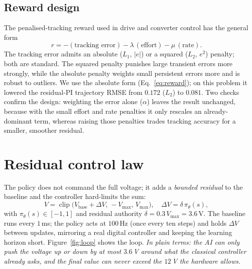 \documentclass[10pt,twocolumn]{article}
\newcommand{\eli}[1]{\textit{In plain terms: #1}}
\begin{document}
\subsection{Reward design}
The penalised-tracking reward used in drive and converter control has the
general form
\[
  r = -(\text{tracking error})-\lambda\,(\text{effort})-\mu\,(\text{rate}).
\]
The tracking error admits an absolute ($L_1$, $|e|$) or a squared ($L_2$,
$e^2$) penalty; both are standard. The squared penalty punishes large
transient errors more strongly, while the absolute penalty weights small
persistent errors more and is robust to outliers. We use the absolute
form (Eq.~\eqref{eq:reward}); on this problem it lowered the residual-PI
trajectory RMSE from $0.172$ ($L_2$) to $0.081$. Two checks confirm the
design: weighting the error alone ($\alpha$) leaves the result unchanged,
because with the small effort and rate penalties it only rescales an
already-dominant term, whereas raising those penalties trades tracking
accuracy for a smaller, smoother residual.

\section{Residual control law}
The policy does not command the full voltage; it adds a \emph{bounded
residual} to the baseline and the controller hard-limits the sum:
\begin{equation}
  V = \operatorname{clip}\!\big(V_{\mathrm{base}}+\Delta V,\,
      -V_{\max},\,V_{\max}\big),\quad
  \Delta V = \delta\,\pi_\theta(s),
  \label{eq:residual}
\end{equation}
with $\pi_\theta(s)\in[-1,1]$ and residual authority
$\delta=0.3\,V_{\max}=3.6$\,V. The baseline runs every $1$\,ms; the
policy acts at $100$\,Hz (once every ten steps) and holds $\Delta V$
between updates, mirroring a real digital controller and keeping the
learning horizon short. Figure~\ref{fig:loop} shows the loop.
\eli{the AI can only push the voltage up or down by at most
$3.6$\,V around what the classical controller already asks, and the
final value can never exceed the $12$\,V the hardware allows.}
\end{document}

